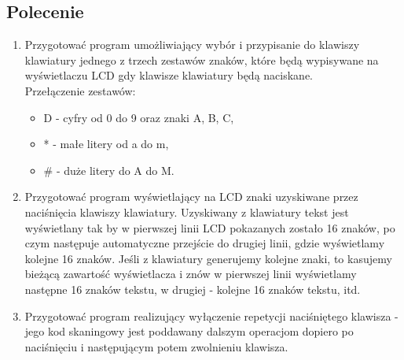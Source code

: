 \documentclass[a4paper,12pt]{extarticle}  %
\begin{document}
\subsection{Polecenie}
\begin{enumerate}
    \item Przygotować program umożliwiający wybór i przypisanie do klawiszy klawiatury 
    jednego z trzech zestawów znaków, 
    które będą wypisywane na wyświetlaczu LCD gdy klawisze klawiatury
    będą naciskane.\\
    Przełączenie zestawów: 
    \begin{itemize}
        \item D - cyfry od 0 do 9 oraz znaki A, B, C,
        \item * - małe litery od a do m,
        \item \# - duże litery do A do M.
    \end{itemize}
% 
\item Przygotować program wyświetlający na LCD znaki uzyskiwane przez naciśnięcia klawiszy klawiatury. 
    Uzyskiwany z klawiatury tekst jest wyświetlany tak by w pierwszej linii LCD pokazanych zostało 16 znaków, 
    po czym następuje automatyczne przejście do drugiej linii, gdzie wyświetlamy kolejne 16 znaków. 
    Jeśli z klawiatury generujemy kolejne znaki, to kasujemy bieżącą zawartość wyświetlacza i 
    znów w pierwszej linii wyświetlamy następne 16 znaków tekstu, w drugiej - kolejne 16 znaków tekstu, itd.
% 
\item Przygotować program realizujący wyłączenie repetycji naciśniętego klawisza - jego kod skaningowy 
    jest poddawany dalszym operacjom dopiero po naciśnięciu i następującym potem zwolnieniu klawisza.
\end{enumerate}
\end{document}
